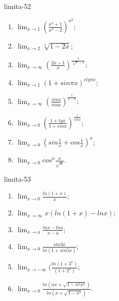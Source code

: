 \begin{defproblem}{limita-52}
\begin{multicols}{2}
\begin{enumerate}
    \item $\lim_{{x \rightarrow 1}} (\frac{x^2+1}{x^2-2})^{x^2}$;
    \item $\lim_{{x \rightarrow 2}} \sqrt[x]{1-2x}$;
    \item $\lim_{{x \rightarrow \infty}} (\frac{2x-1}{x})^{\frac{1}{\sqrt[3]{x}-1}}$;
    \item $\lim_{{x \rightarrow 1}} (1+sin \pi x)^{ctg \pi x}$;
    \item $\lim_{{x \rightarrow \infty}} (\frac{sin x}{sin a})^{\frac{1}{x-a}}$;
    \item $\lim_{{x \rightarrow 0}} (\frac{1+tg x}{1+sin x})^{\frac{1}{sin x}}$;
    \item $\lim_{{x \rightarrow 0}} (sin \frac{1}{x}+cos \frac{1}{x})^x$;
    \item $\lim_{{x \rightarrow 0}} cos ^n \frac{x}{\sqrt{n}}$.
\end{enumerate}
\end{multicols}
\end{defproblem}

\begin{defproblem}{limita-53}
\begin{multicols}{2}
\begin{enumerate}
    \item $\lim_{{x \rightarrow 0}} \frac{ln(1+x)}{x}$;
    \item $\lim_{{x \rightarrow \infty}} x(ln(1+x)-ln x)$;
    \item $\lim_{{x \rightarrow a}} \frac{ln x - ln a}{x-a}$;
    \item $\lim_{{x \rightarrow 0}} \frac{sin 3x}{ln(1+sin 5x)}$;
    \item $\lim_{{x \rightarrow -\infty}} (\frac{ln (1+3^x)}{(1+2^x)}$;
    \item $\lim_{{x \rightarrow 0}} \frac{ln(nx+\sqrt{1-n^2x^2})}{ln(x+\sqrt{1-x^2})}$.
\end{enumerate}
\end{multicols}
\end{defproblem}

